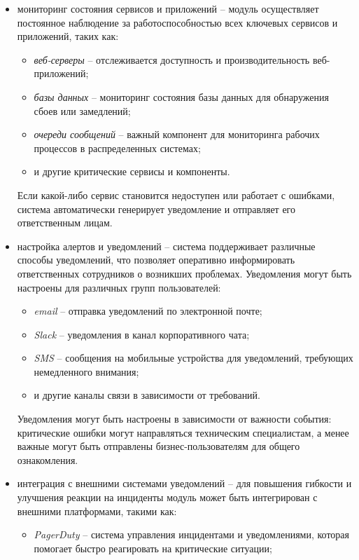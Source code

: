 \begin{itemize}
    \item мониторинг состояния сервисов и приложений -- модуль осуществляет постоянное наблюдение за работоспособностью всех ключевых сервисов и приложений, таких как:
    \begin{itemize}
        \item \textit{веб-серверы} -- отслеживается доступность и производительность веб-приложений;
        \item \textit{базы данных} -- мониторинг состояния базы данных для обнаружения сбоев или замедлений;
        \item \textit{очереди сообщений} -- важный компонент для мониторинга рабочих процессов в распределенных системах;
        \item и другие критические сервисы и компоненты.
    \end{itemize}
    Если какой-либо сервис становится недоступен или работает с ошибками, система автоматически генерирует уведомление и отправляет его ответственным лицам.
    \item настройка алертов и уведомлений -- система поддерживает различные способы уведомлений, что позволяет оперативно информировать ответственных сотрудников о возникших проблемах. Уведомления могут быть настроены для различных групп пользователей:
    \begin{itemize}
        \item \textit{email} -- отправка уведомлений по электронной почте;
        \item \textit{Slack} -- уведомления в канал корпоративного чата;
        \item \textit{SMS} -- сообщения на мобильные устройства для уведомлений, требующих немедленного внимания;
        \item и другие каналы связи в зависимости от требований.
    \end{itemize}
    Уведомления могут быть настроены в зависимости от важности события: критические ошибки могут направляться техническим специалистам, а менее важные могут быть отправлены бизнес-пользователям для общего ознакомления.
    \item интеграция с внешними системами уведомлений -- для повышения гибкости и улучшения реакции на инциденты модуль может быть интегрирован с внешними платформами, такими как:
    \begin{itemize}
        \item \textit{PagerDuty} -- система управления инцидентами и уведомлениями, которая помогает быстро реагировать на критические ситуации;

\end{itemize}
\end{itemize}
